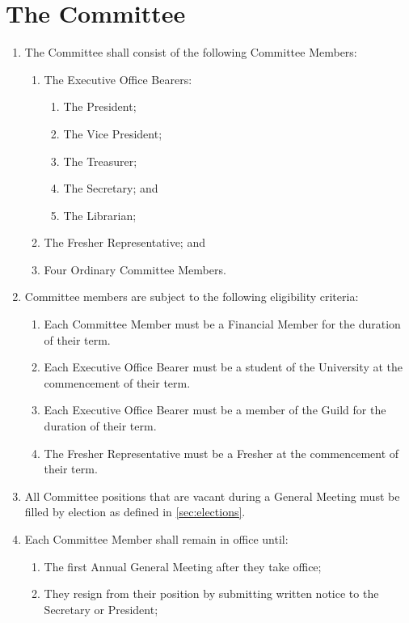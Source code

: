 \documentclass[a4paper]{article}
\begin{document}
\section{The Committee} \label{sec:committee}
\begin{enumerate}
    \item The Committee shall consist of the following Committee Members:
    \begin{enumerate}
              \item The Executive Office Bearers:
              \begin{enumerate}
                  \item The President;
                  \item The Vice President;
                  \item The Treasurer;
                  \item The Secretary; and
                  \item The Librarian;
              \end{enumerate}
              \item The Fresher Representative; and
              \item Four Ordinary Committee Members.
          \end{enumerate}
    \item Committee members are subject to the following eligibility criteria:
    \begin{enumerate}
        \item Each Committee Member must be a Financial Member for the duration of their term.
        \item Each Executive Office Bearer must be a student of the University at the commencement of their term.
        \item Each Executive Office Bearer must be a member of the Guild for the duration of their term.
        \item The Fresher Representative must be a Fresher at the commencement of their term.
    \end{enumerate}
    \item All Committee positions that are vacant during a General Meeting must be filled by election as defined in \cref{sec:elections}.
    \item Each Committee Member shall remain in office until:
    \begin{enumerate}
        \item The first Annual General Meeting after they take office;
        \item They resign from their position by submitting written notice to the Secretary or President;

\end{enumerate}
\end{enumerate}
\end{document}

